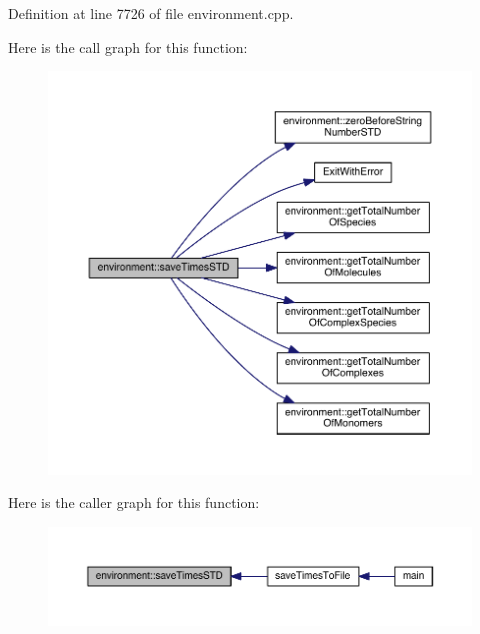 Definition at line 7726 of file environment.\-cpp.



Here is the call graph for this function\-:\nopagebreak
\begin{figure}[H]
\begin{center}
\leavevmode
\includegraphics[width=350pt]{a00014_a73e83c4fcfe612514714a6692270351e_cgraph}
\end{center}
\end{figure}




Here is the caller graph for this function\-:\nopagebreak
\begin{figure}[H]
\begin{center}
\leavevmode
\includegraphics[width=350pt]{a00014_a73e83c4fcfe612514714a6692270351e_icgraph}
\end{center}
\end{figure}


